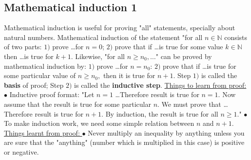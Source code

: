 \documentclass{article}
\begin{document}
\subsection{Mathematical induction 1}
Mathematical induction is useful for proving "all" statements, specially about natural numbers.
\newline
\newline
Mathematical induction of the statement "for all $n \in \mathbb{N}$ consists of two parts:
\newline
$1) $ prove \dots for $n = 0$;
\newline
$2) $ prove that if \dots is true for some value $k \in \mathbb{N}$ then \dots is true for $k + 1$.
\newline
\newline
Likewise, "for all $n \geq n_0, \dots$" can be proved by mathematical induction by:
\newline
$1) $ prove \dots for $n = n_0$:
\newline
$2) $ prove that if \dots is true for some particular value of $n \geq n_0,$ then it is true for $n + 1$.
\newline
\newline
Step $1)$ is called the \textbf{ basis } of proof; Step $2) $ is called the \textbf{ inductive step}.
\newline
{}
\newline
\newline
\underline{Things to learn from proof:}
\newline
$\bullet $ Inductive proof format:
\newline
"Let $n = 1$ \dots Therefore result is true for $n = 1$. Now assume that the result is true for some particular $n$. We must prove that \dots Therefore result is true for $n + 1$. By induction, the result is true for all $n \geq 1$."
\newline 
$\bullet $ To make induction work, we need some simple relation between $n$ and $n + 1$.
\newline
{}
\newline
\newline
\underline{Things learnt from proof: }
\newline
$\bullet $ Never multiply an inequality by anything unless you are sure that the "anything" (number which is multiplied in this case) is positive or negative.
\newpage
\end{document}
